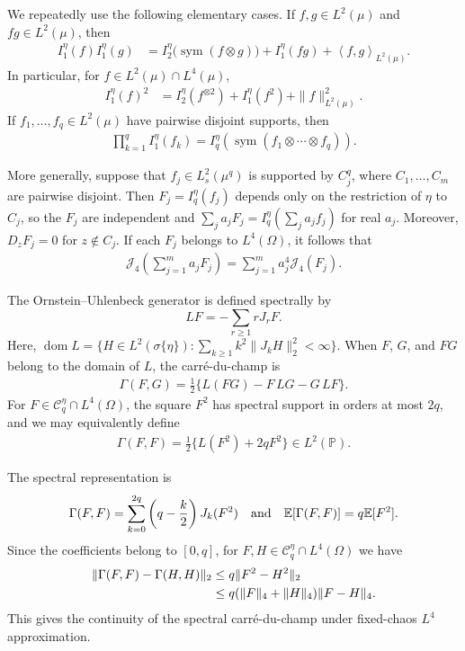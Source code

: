 \documentclass[letterpaper,11pt,reqno]{amsart}
\numberwithin{equation}{section}
\theoremstyle{plain}
\theoremstyle{definition}
\theoremstyle{remark}
\newcommand{\E}{\mathbb{E}}
\newcommand{\PP}{\mathbb{P}}
\newcommand{\cC}{\mathcal{C}}
\DeclareMathOperator{\sym}{sym}
\newcommand{\noi}{\noindent}
\newcommand{\ot}{\otimes}
\newcommand{\Jfour}{\mathcal J_4}
\newcommand{\Gam}{\Gamma}
\newcommand{\inner}[2]{\left\langle #1,#2\right\rangle}
\newcommand{\AND}{\quad{\rm and}\quad}
\begin{document}
We repeatedly use the following elementary cases.  If
$f,g\in L^2(\mu)$ and $fg\in L^2(\mu)$, then
\noi
\begin{align}
 I_1^\eta(f)I_1^\eta(g)
 &=
 I_2^\eta\bigl(\sym(f\ot g)\bigr)
 +I_1^\eta(fg)
 +\inner{f}{g}_{L^2(\mu)}.
 \label{I1_prod}
\end{align}
In particular, for $f\in L^2(\mu)\cap L^4(\mu)$,
\noi
\begin{align*}
 I_1^\eta(f)^2
 &=
 I_2^\eta(f^{\ot2})
 +I_1^\eta(f^2)
 +\|f\|_{L^2(\mu)}^2.
\end{align*}
If $f_1,\ldots,f_q\in L^2(\mu)$ have pairwise disjoint supports,
then
\noi
\begin{align}
 \prod_{k=1}^q I_1^\eta(f_k)
 =
 I_q^\eta\left(
 \sym(f_1\ot\cdots\ot f_q)
 \right).
 \label{disjoint_prod}
\end{align}

More generally, suppose that $f_j\in L_s^2(\mu^q)$ is supported
by $C_j^q$, where $C_1,\ldots,C_m$ are pairwise disjoint.
Then $F_j=I_q^\eta(f_j)$ depends only on the restriction of
$\eta$ to $C_j$, so the $F_j$ are independent and
$\sum_j a_jF_j=I_q^\eta(\sum_j a_jf_j)$ for real $a_j$.
Moreover, $D_zF_j=0$ for $z\notin C_j$.  If each $F_j$
belongs to $L^4(\Omega)$, it follows that
\noi
\begin{align}
 \Jfour\left(\sum_{j=1}^m a_jF_j\right)
 =\sum_{j=1}^m a_j^4\Jfour(F_j).
 \label{J4_blocks}
\end{align}

The Ornstein--Uhlenbeck generator is defined spectrally by
\[
 LF=-\sum_{r\geq1}rJ_rF.
\]
Here,
$\operatorname{dom}L
 =\{H\in L^2(\sigma\{\eta\}):
 \sum_{k\geq1}k^2\|J_kH\|_2^2<\infty\}$.
When $F$, $G$, and $FG$ belong to the domain of $L$, the carr\'e-du-champ
is
\noi
\begin{align}\label{GF1}
 \Gam(F,G)
 =\frac12\{L(FG)-F\,LG-G\,LF\}.
\end{align}
For $F\in\cC_q^\eta\cap L^4(\Omega)$, the square $F^2$ has spectral support in
orders at most $2q$, and we may equivalently define
\noi
\begin{align}\label{GF2}
 \Gam(F,F)
 =\frac12\{L(F^2)+2qF^2\}\in L^2(\PP).
\end{align}

The spectral representation is
\[
 \Gam(F,F)=\sum_{k=0}^{2q}\left(q-\frac k2\right)J_k(F^2)
 \AND
 \E[\Gam(F,F)]=q\E[F^2].
\]
Since the coefficients belong to $[0,q]$, for
$F,H\in\cC_q^\eta\cap L^4(\Omega)$ we have
\noi
\begin{align}
 \|\Gam(F,F)-\Gam(H,H)\|_2
 &\leq q\|F^2-H^2\|_2
 \notag\\
 &\leq q(\|F\|_4+\|H\|_4)\|F-H\|_4.
 \label{Gamma_cont}
\end{align}
This gives the continuity of the spectral carr\'e-du-champ
under fixed-chaos $L^4$ approximation.
\end{document}
